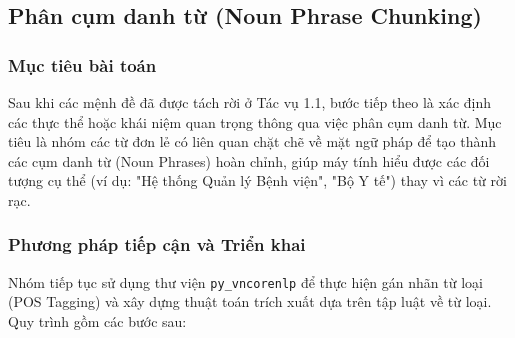 \subsection{Phân cụm danh từ (Noun Phrase Chunking)}

\subsubsection{Mục tiêu bài toán}
Sau khi các mệnh đề đã được tách rời ở Tác vụ 1.1, bước tiếp theo là xác định các thực thể hoặc khái niệm quan trọng thông qua việc phân cụm danh từ. Mục tiêu là nhóm các từ đơn lẻ có liên quan chặt chẽ về mặt ngữ pháp để tạo thành các cụm danh từ (Noun Phrases) hoàn chỉnh, giúp máy tính hiểu được các đối tượng cụ thể (ví dụ: "Hệ thống Quản lý Bệnh viện", "Bộ Y tế") thay vì các từ rời rạc.

\subsubsection{Phương pháp tiếp cận và Triển khai}
Nhóm tiếp tục sử dụng thư viện \texttt{py\_vncorenlp} để thực hiện gán nhãn từ loại (POS Tagging) và xây dựng thuật toán trích xuất dựa trên tập luật về từ loại. Quy trình gồm các bước sau:

